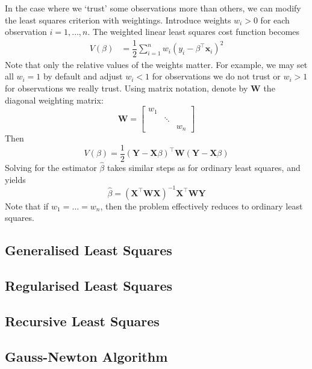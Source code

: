 \documentclass[11pt]{report} %
\begin{document}
In the case where we `trust' some observations more than others, we can modify the least squares criterion with weightings. Introduce weights $w_{i} > 0$ for each observation $i = 1, \dots, n$. The weighted linear least squares cost function becomes
\begin{align}
V\left(\beta\right) &= \dfrac{1}{2}\sum_{i = 1}^{n}w_{i}\left(y_{i} - \beta^{\top}\mathbf{x}_{i}\right)^{2}
\end{align}
Note that only the relative values of the weights matter. For example, we may set all $w_{i} = 1$ by default and adjust $w_{i} < 1$ for observations we do not trust or $w_{i} > 1$ for observations we really trust. Using matrix notation, denote by $\mathbf{W}$ the diagonal weighting matrix:
\begin{equation}
\mathbf{W} = \begin{bmatrix}
w_{1} & & \\ & \ddots & \\ & & w_{n}
\end{bmatrix}
\end{equation}
Then
\begin{equation}
V\left(\beta\right) = \dfrac{1}{2}\left(\mathbf{Y} - \mathbf{X}\beta\right)^{\top}\mathbf{W}\left(\mathbf{Y} - \mathbf{X}\beta\right)
\end{equation}
Solving for the estimator $\hat{\beta}$ takes similar steps as for ordinary least squares, and yields
\begin{equation}
\hat{\beta} = \left(\mathbf{X}^{\top}\mathbf{W}\mathbf{X}\right)^{-1}\mathbf{X}^{\top}\mathbf{W}\mathbf{Y}
\end{equation}
Note that if $w_{1} = \dots = w_{n}$, then the problem effectively reduces to ordinary least squares.

\subsection{Generalised Least Squares}

\subsection{Regularised Least Squares}

\subsection{Recursive Least Squares}

\subsection{Gauss-Newton Algorithm}
\end{document}
